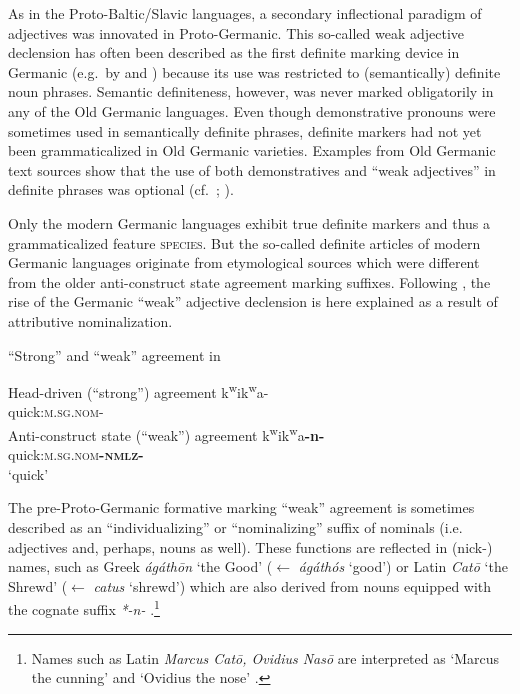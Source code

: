 As in the Proto-Baltic/Slavic languages, a secondary inflectional paradigm of adjectives was innovated in Proto-Germanic. This so-called weak adjective declension has often been described as the first definite marking device in Germanic (e.g.~by \citealt{heinrichs1954} and \citealt[170]{ringe2006}) because its use was restricted to (semantically) definite noun phrases. Semantic definiteness, however, was never marked obligatorily in any of the Old Germanic languages. Even though demonstrative pronouns were sometimes used in semantically definite phrases, definite markers had not yet been grammaticalized in Old Germanic varieties. Examples from Old Germanic text sources show that the use of both demonstratives and “weak adjectives” in definite phrases was optional (cf.~\citealt{philippi1997}; \citealt{heinrichs1954}).

Only the modern Germanic languages exhibit true definite markers and thus a grammaticalized feature \textsc{species}. But the so-called definite articles of modern Germanic languages originate from etymological sources which were different from the older anti-construct state agreement marking suffixes. Following \citet[267–268]{riesler2006a}, the rise of the Germanic “weak” adjective declension is here explained as a result of attributive nominalization. 
\begin{exe}
\ex “Strong” and “weak” agreement in \\
\begin{xlist}
\ex	Head-driven (“strong”) agreement
\gll *k\textsuperscript{w}ik\textsuperscript{w}a-\\
quick:\textsc{m.sg.nom-}\\
\ex	Anti-construct state (“weak”) agreement
\gll *k\textsuperscript{w}ik\textsuperscript{w}a\textbf{-n-}\\
quick:\textsc{m.sg.nom}\textbf{\textsc{-nmlz-}}\\
\glt	‘quick’
\end{xlist}
\end{exe}
The pre-Proto-Germanic formative marking “weak” agreement is sometimes described as an “individualizing” or “nominalizing” suffix of nominals (i.e. adjectives and, perhaps, nouns as well). These functions are reflected in (nick-) names, such as Greek \textit{ágáthōn} ‘the Good’ ($\leftarrow$ \textit{ágáthós} ‘good’) or Latin \textit{Catō} ‘the Shrewd’ ($\leftarrow$ \textit{catus} ‘shrewd’) which are also derived from nouns equipped with the cognate suffix \textit{*-n-} \citep[170]{ringe2006}.\footnote{Names such as Latin \textit{Marcus Catō, Ovidius Nasō} are interpreted as ‘Marcus the cunning’ and ‘Ovidius the nose’ \citep[6–7]{nocentini1996}.}

